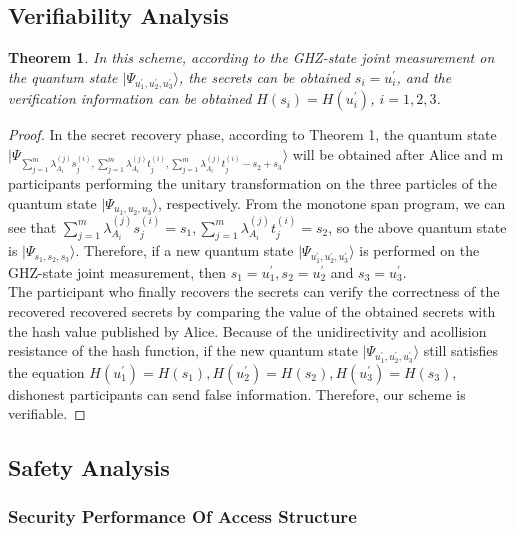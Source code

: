 \documentclass[pdflatex,sn-mathphys]{sn-jnl}%
\theoremstyle{thmstyleone}%
\newtheorem{theorem}{Theorem}%
\theoremstyle{thmstyletwo}%
\theoremstyle{thmstylethree}%
\begin{document}
\subsection{Verifiability Analysis}\label{subsec2}

\begin{theorem}
 In this scheme, according to the GHZ-state joint measurement on the quantum state $\mid\varPsi_{{u_1^\prime},{u_2^\prime},{u_3^\prime}}\rangle$, the secrets can be obtained $s_i=u_i^\prime$, and the verification information can be obtained $H(s_i)=H(u_i^\prime)$, $i=1,2,3$. 
\end{theorem}
\begin{proof}
    In the secret recovery phase, according to Theorem 1, the quantum state $ \mid\varPsi_{\sum_{j=1}^{m}{\lambda_{A_i}^{(j)}s_j^{(i)}},\sum_{j=1}^{m}{\lambda_{A_i}^{(j)}t_j^{(i)}},\sum_{j=1}^{m}{\lambda_{A_i}^{(j)}t_j^{(i)}-s_2+s_3}}\rangle$ will be obtained after Alice and m participants performing the unitary transformation on the three particles of the quantum state $\mid\varPsi_{{u_1},{u_2},{u_3}}\rangle$, respectively. From the monotone span program, we can see that $\sum_{j=1}^{m}{\lambda_{A_i}^{(j)}s_j^{(i)}}=s_1,\sum_{j=1}^{m}{\lambda_{A_i}^{(j)}t_j^{(i)}}=s_2$, so the above quantum state is $\mid\varPsi_{{s_1},{s_2},{s_3}}\rangle$. Therefore, if a new quantum state $\mid\varPsi_{{u_1^\prime},{u_2^\prime},{u_3^\prime}}\rangle$ is performed on the GHZ-state joint measurement, then $s_1=u_1^\prime, s_2=u_2^\prime$ and $s_3=u_3^\prime$.\\
\indent The participant who finally recovers the secrets can verify the correctness of the recovered recovered secrets by comparing the value of the obtained secrets with the hash value published by Alice. Because of the unidirectivity and acollision resistance of the hash function, if the new quantum state $\mid\varPsi_{{u_1^\prime},{u_2^\prime},{u_3^\prime}}\rangle$ still satisfies the equation $H(u_1^\prime)=H(s_1), H(u_2^\prime)=H(s_2), H(u_3^\prime)=H(s_3)$, dishonest participants can send false information. Therefore, our scheme is verifiable.
\end{proof}

\subsection{Safety Analysis}\label{subsec3}

\subsubsection{Security Performance Of Access Structure}\label{subsubsec1}
\end{document}
